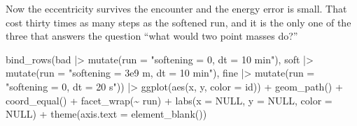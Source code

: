 \documentclass[
  10.5pt,
  letterpaper,
]{scrbook}
\newenvironment{Shaded}{\begin{snugshade}}{\end{snugshade}}
\newcommand{\AttributeTok}[1]{\textcolor[rgb]{0.00,0.00,0.00}{#1}}
\newcommand{\CommentTok}[1]{\textcolor[rgb]{0.00,0.00,0.00}{\textit{#1}}}
\newcommand{\ConstantTok}[1]{\textcolor[rgb]{0.00,0.00,0.00}{#1}}
\newcommand{\DecValTok}[1]{\textcolor[rgb]{0.00,0.00,0.00}{#1}}
\newcommand{\FunctionTok}[1]{\textcolor[rgb]{0.00,0.00,0.00}{#1}}
\newcommand{\NormalTok}[1]{\textcolor[rgb]{0.00,0.00,0.00}{#1}}
\newcommand{\OtherTok}[1]{\textcolor[rgb]{0.00,0.00,0.00}{#1}}
\newcommand{\SpecialCharTok}[1]{\textcolor[rgb]{0.00,0.00,0.00}{#1}}
\newcommand{\StringTok}[1]{\textcolor[rgb]{0.00,0.00,0.00}{#1}}
\theoremstyle{definition}
\theoremstyle{plain}
\theoremstyle{remark}
\begin{document}
\begin{Shaded}
\end{Shaded}

Now the eccentricity survives the encounter and the energy error is
small. That cost thirty times as many steps as the softened run, and it
is the only one of the three that answers the question ``what would two
point masses do?''

\begin{Shaded}
\begin{Highlighting}[]
\FunctionTok{bind\_rows}\NormalTok{(bad  }\SpecialCharTok{|\textgreater{}} \FunctionTok{mutate}\NormalTok{(}\AttributeTok{run =} \StringTok{"softening = 0, dt = 10 min"}\NormalTok{),}
\NormalTok{          soft }\SpecialCharTok{|\textgreater{}} \FunctionTok{mutate}\NormalTok{(}\AttributeTok{run =} \StringTok{"softening = 3e9 m, dt = 10 min"}\NormalTok{),}
\NormalTok{          fine }\SpecialCharTok{|\textgreater{}} \FunctionTok{mutate}\NormalTok{(}\AttributeTok{run =} \StringTok{"softening = 0, dt = 20 s"}\NormalTok{)) }\SpecialCharTok{|\textgreater{}}
  \FunctionTok{ggplot}\NormalTok{(}\FunctionTok{aes}\NormalTok{(x, y, }\AttributeTok{color =}\NormalTok{ id)) }\SpecialCharTok{+}
  \FunctionTok{geom\_path}\NormalTok{() }\SpecialCharTok{+}
  \FunctionTok{coord\_equal}\NormalTok{() }\SpecialCharTok{+}
  \FunctionTok{facet\_wrap}\NormalTok{(}\SpecialCharTok{\textasciitilde{}}\NormalTok{ run) }\SpecialCharTok{+}
  \FunctionTok{labs}\NormalTok{(}\AttributeTok{x =} \ConstantTok{NULL}\NormalTok{, }\AttributeTok{y =} \ConstantTok{NULL}\NormalTok{, }\AttributeTok{color =} \ConstantTok{NULL}\NormalTok{) }\SpecialCharTok{+}
  \FunctionTok{theme}\NormalTok{(}\AttributeTok{axis.text =} \FunctionTok{element\_blank}\NormalTok{())}
\end{Highlighting}
\end{Shaded}
\end{document}
